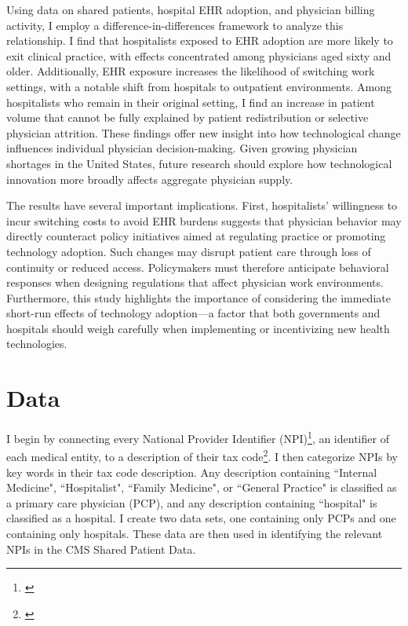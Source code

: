 \documentclass[12pt]{article}
\begin{document}
Using data on shared patients, hospital EHR adoption, and physician billing activity, I employ a difference-in-differences framework to analyze this relationship. I find that hospitalists exposed to EHR adoption are more likely to exit clinical practice, with effects concentrated among physicians aged sixty and older. Additionally, EHR exposure increases the likelihood of switching work settings, with a notable shift from hospitals to outpatient environments. Among hospitalists who remain in their original setting, I find an increase in patient volume that cannot be fully explained by patient redistribution or selective physician attrition. These findings offer new insight into how technological change influences individual physician decision-making. Given growing physician shortages in the United States, future research should explore how technological innovation more broadly affects aggregate physician supply.

The results have several important implications. First, hospitalists’ willingness to incur switching costs to avoid EHR burdens suggests that physician behavior may directly counteract policy initiatives aimed at regulating practice or promoting technology adoption. Such changes may disrupt patient care through loss of continuity or reduced access. Policymakers must therefore anticipate behavioral responses when designing regulations that affect physician work environments. Furthermore, this study highlights the importance of considering the immediate short-run effects of technology adoption—a factor that both governments and hospitals should weigh carefully when implementing or incentivizing new health technologies.




\clearpage
\onehalfspacing

\printbibliography

\clearpage


\appendix

\section{Data}\label{app:data}

I begin by connecting every National Provider Identifier (NPI)\footnote{\hyperlink{https://download.cms.gov/nppes/NPI/Files.html}{}}, an identifier of each medical entity, to a description of their tax code\footnote{\hyperlink{https://nucc.org/index.php/code-sets-mainmenu-41/provider-taxonomy-mainmenu-40/pdf-mainmenu-53}{}}. I then categorize NPIs by key words in their tax code description. Any description containing ``Internal Medicine", ``Hospitalist", ``Family Medicine", or ``General Practice" is classified as a primary care physician (PCP), and any description containing ``hospital" is classified as a hospital. I create two data sets, one containing only PCPs and one containing only hospitals. These data are then used in identifying the relevant NPIs in the CMS Shared Patient Data. 
\end{document}
